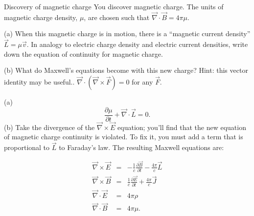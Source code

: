 \documentclass[makesolutionspdf]{esg8022pset}
\begin{document}
\begin{problem}{Discovery of magnetic charge}
You discover magnetic
charge.  The units of magnetic charge density,
$\mu$, are chosen such that $\vec\nabla\cdot\vec B = 4\pi\mu$.

\par\noindent (a) When this magnetic charge is in motion,
there is a ``magnetic current density'' $\vec {L} = \mu \vec{ v}$.  In
analogy to electric charge density and electric current densities,
write down the equation of continuity for magnetic charge.

\par\noindent (b) What do Maxwell's equations become with this
new charge? Hint: this vector identity may be useful.. $\vec\nabla\cdot(\vec{\nabla}\times\vec{F})=0$ for any $\vec{F}$.
\end{problem}

\begin{solution}
(a) \begin{equation}
\frac{\partial \mu}{\partial t}+\vec{\nabla}\cdot\vec{L}=0.
\end{equation}
(b) Take the divergence of the $\vec\nabla\times\vec E$ equation; you'll
find that the new equation of magnetic charge continuity is violated.
To fix it, you must add a term that is proportional to $\vec L$ to
Faraday's law.  The resulting Maxwell equations are:

\begin{eqnarray}
\vec{\nabla}\times\vec{E} &=& -\frac{1}{c}\frac{\partial
\vec{B}}{\partial t}-\frac{4\pi}{c}\vec{L}\\
\vec{\nabla}\times\vec{B} &=& \frac{1}{c}\frac{\partial
\vec{E}}{\partial t}+\frac{4\pi}{c}\vec{J}\\
\vec{\nabla}\cdot\vec{E} &=& 4\pi\rho\\
\vec{\nabla}\cdot\vec{B} &=& 4\pi\mu.
\end{eqnarray}




\end{solution}
\end{document}
